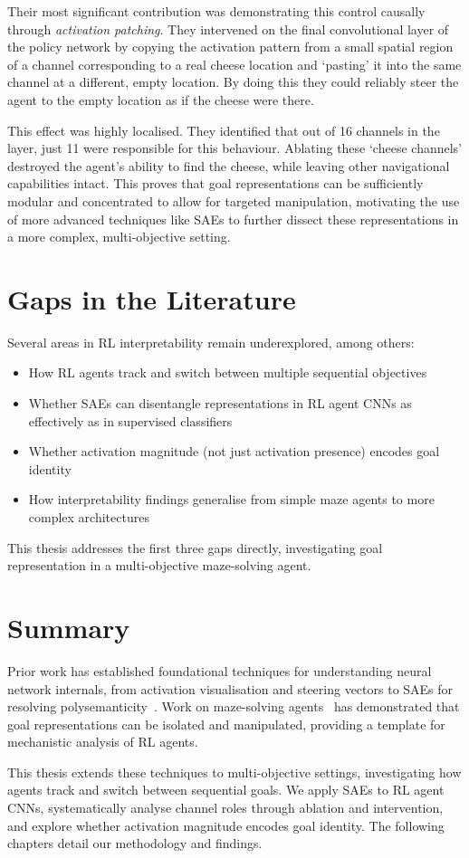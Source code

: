 Their most significant contribution was demonstrating this control causally through \emph{activation patching}. They intervened on the final convolutional layer of the policy network by copying the activation pattern from a small spatial region of a channel corresponding to a real cheese location and `pasting' it into the same channel at a different, empty location. By doing this they could reliably steer the agent to the empty location as if the cheese were there.

This effect was highly localised. They identified that out of 16 channels in the layer, just 11 were responsible for this behaviour. Ablating these `cheese channels' destroyed the agent's ability to find the cheese, while leaving other navigational capabilities intact. This proves that goal representations can be sufficiently modular and concentrated to allow for targeted manipulation, motivating the use of more advanced techniques like SAEs to further dissect these representations in a more complex, multi-objective setting.


\section{Gaps in the Literature}\label{sec:gaps}
Several areas in RL interpretability remain underexplored, among others:

\begin{itemize}
    \item How RL agents track and switch between multiple sequential objectives
    \item Whether SAEs can disentangle representations in RL agent CNNs as effectively as in supervised classifiers
    \item Whether activation magnitude (not just activation presence) encodes goal identity
    \item How interpretability findings generalise from simple maze agents to more complex architectures
\end{itemize}

This thesis addresses the first three gaps directly, investigating goal representation in a multi-objective maze-solving agent.

\section{Summary}\label{sec:lit_summary}
Prior work has established foundational techniques for understanding neural network internals, from activation visualisation and steering vectors to SAEs for resolving polysemanticity~\citep{olah_2020_zoom,elhage2022superposition,bricken2023monosemanticity}. Work on maze-solving agents~\citep{mini_2023_understanding,hilton_2020_understanding} has demonstrated that goal representations can be isolated and manipulated, providing a template for mechanistic analysis of RL agents.

This thesis extends these techniques to multi-objective settings, investigating how agents track and switch between sequential goals. We apply SAEs to RL agent CNNs, systematically analyse channel roles through ablation and intervention, and explore whether activation magnitude encodes goal identity. The following chapters detail our methodology and findings.